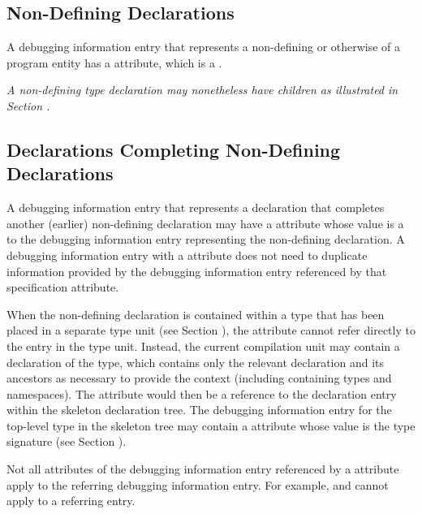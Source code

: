 \subsection{Non-Defining Declarations}
A debugging information entry that 
represents a non-defining 
or otherwise 
of a program entity has a
\DWATdeclarationDEFN{} attribute, which is a 
.

\textit{
\bb
A non-defining type declaration may nonetheless have 
children as illustrated in Section
.
\eb
}

\subsection{Declarations Completing Non-Defining Declarations}
\hypertarget{chap:DWATspecificationincompletenondefiningorseparatedeclaration}{}
A debugging information entry that represents a declaration
that completes another (earlier) non-defining declaration may have a 
\DWATspecificationDEFN{}
attribute whose value is a  to
the debugging information entry representing the non-defining declaration. 
A debugging information entry with a 
\DWATspecificationNAME{} 
attribute does not need to duplicate information provided by the 
debugging information entry referenced by that specification attribute.

When the non-defining declaration is contained within a type that has
been placed in a separate type unit (see Section ), 
the \DWATspecification{} attribute cannot refer directly to the entry in
the type unit. Instead, the current compilation unit may contain a
 declaration of the type, which contains only the relevant
declaration and its ancestors as necessary to provide the context
(including containing types and namespaces). The \DWATspecification{}
attribute would then be a reference to the declaration entry within
the skeleton declaration tree. The debugging information entry for the
top-level type in the skeleton tree may contain a \DWATsignature{}
attribute whose value is the type signature 
(see Section ).


Not all attributes of the debugging information entry referenced by a
\DWATspecification{} attribute 
apply to the referring debugging information entry.
For
example,
\DWATsibling{} and 
\DWATdeclaration{} 
cannot apply to a 
referring
entry.


